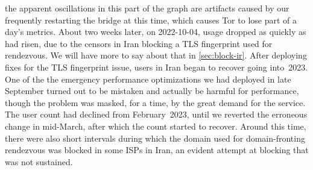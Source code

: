 \documentclass[letterpaper,twocolumn]{article}
\begin{document}
the apparent oscillations in this part of the graph
are artifacts caused by our frequently restarting the bridge at this time,
which causes Tor to lose part of a day's metrics.
About two weeks later, on \mbox{2022-10-04},
usage dropped as quickly as had risen,
due to the censors in Iran blocking a TLS fingerprint
used for rendezvous.
We will have more to say about that in \autoref{sec:block-ir}.
After deploying fixes for the TLS fingerprint issue,
users in Iran began to recover going into~2023.
One of the the emergency performance optimizations we had deployed in late September
turned out to be mistaken and actually be harmful for performance,
though the problem was masked, for a time, by the great demand for the service.
The user count had declined from February~2023,
until we reverted the erroneous change in mid-March,
after which the count started to recover.
Around this time, there were also short intervals during which
the domain used for domain-fronting rendezvous
was blocked in some ISPs in Iran,
an evident attempt at blocking that was not sustained.
\end{document}

